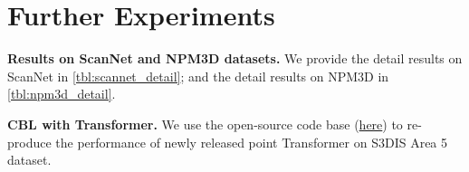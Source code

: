 \documentclass[10pt,twocolumn,letterpaper]{article}
\begin{document}
\begin{table}[t]
\begin{center}
\centering
{}\end{center}
\caption{Same setting as in \cref{tbl:bound} in main paper.
}
\label{tbl:bound_more}
\end{table}

\section{Further Experiments}
\label{sec:sup:rst}
\noindent\textbf{Results on ScanNet and NPM3D datasets.}
We provide the detail results on ScanNet in \cref{tbl:scannet_detail}; and the detail results on NPM3D in \cref{tbl:npm3d_detail}.

\noindent\textbf{CBL with Transformer.}
We use the open-source code base (\href{https://github.com/POSTECH-CVLab/point-transformer}{here}) to re-produce the performance of newly released point Transformer\cite{pttransformer} on S3DIS\cite{s3dis} Area 5 dataset.
\end{document}
